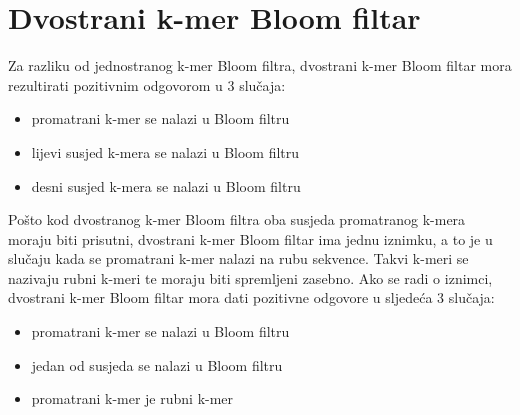 \documentclass[times, utf8, seminar, numeric]{fer}
\begin{document}
\section{Dvostrani k-mer Bloom filtar}
Za razliku od jednostranog k-mer Bloom filtra, dvostrani k-mer Bloom filtar mora
rezultirati pozitivnim odgovorom u 3 slučaja:
\begin{itemize}
  \item{promatrani k-mer se nalazi u Bloom filtru}
  \item{lijevi susjed k-mera se nalazi u Bloom filtru}
  \item{desni susjed k-mera se nalazi u Bloom filtru}
\end{itemize}
Pošto kod dvostranog k-mer Bloom filtra oba susjeda promatranog k-mera moraju biti
prisutni, dvostrani k-mer Bloom filtar ima jednu iznimku, a to je u slučaju kada
se promatrani k-mer nalazi na rubu sekvence. Takvi k-meri se nazivaju rubni k-meri
te moraju biti spremljeni zasebno. Ako se radi o iznimci, dvostrani k-mer Bloom
filtar mora dati pozitivne odgovore u sljedeća 3 slučaja:
\begin{itemize}
  \item{promatrani k-mer se nalazi u Bloom filtru}
  \item{jedan od susjeda se nalazi u Bloom filtru}
  \item{promatrani k-mer je rubni k-mer}
\end{itemize}
\end{document}
